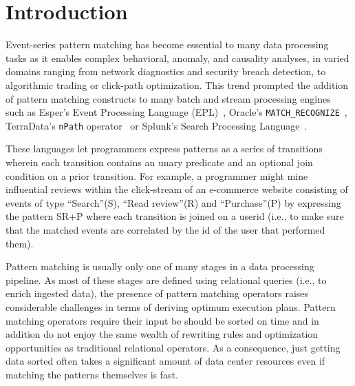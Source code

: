 \section{Introduction}


Event-series pattern matching has become essential to many data processing tasks
as it enables complex behavioral, anomaly, and causality analyses, in varied
domains ranging from network diagnostics and security breach detection, to
algorithmic trading or click-path optimization.  This trend prompted the
addition of pattern matching constructs to many batch and stream processing
engines such as Esper's Event Processing Language (EPL)~\cite{esper_epl},
Oracle's \texttt{MATCH\_RECOGNIZE}~\cite{oracle_mr}, TerraData's \texttt{nPath}
operator~\cite{aster_npath} or Splunk's Search Processing
Language~\cite{Carasso:2012}.

These languages let programmers express patterns as a series of transitions
wherein each transition contains an unary predicate and an optional join
condition on a prior transition.  For example, a programmer might mine
influential reviews within the click-stream of an e-commerce website consisting
of events of type ``Search''(S), ``Read review''(R) and ``Purchase''(P) by
expressing the pattern SR+P where each transition is joined on a userid (i.e.,
to make sure that the matched events are correlated by the id of the user that
performed them).

Pattern matching is usually only one of many stages in a data processing
pipeline.  As most of these stages are defined using relational queries (i.e.,
to enrich ingested data), the presence of pattern matching operators raises
considerable challenges in terms of deriving optimum execution plans.  Pattern
matching operators require their input be should be sorted on time and in
addition do not enjoy the same wealth of rewriting rules and optimization
opportunities as traditional relational operators.  As a consequence, just
getting data sorted often takes a significant amount of data center resources
even if matching the patterns themselves is fast.

